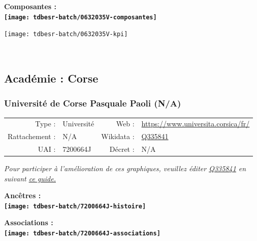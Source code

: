 \documentclass[12pt,french,]{article}
\begin{document}
\hrulefill

\begin{center} \bf Composantes : \\  
\texttt{[image: tdbesr-batch/0632035V-composantes]} \end{center}

\begin{center}\texttt{[image: tdbesr-batch/0632035V-kpi]} \end{center}\checkoddpage

\ifoddpage \fi ~\newpage  

\hypertarget{acaduxe9mie-corse}{%
\subsection{Académie : Corse}\label{acaduxe9mie-corse}}

\hypertarget{universituxe9-de-corse-pasquale-paoli-na}{%
\subsubsection{Université de Corse Pasquale Paoli
(N/A)}\label{universituxe9-de-corse-pasquale-paoli-na}}

\begin{tabular*}{\textwidth}{rp{5cm}rl}  
\hline  
Type : & Université & Web : &\href{https://www.universita.corsica/fr/}{https://www.universita.corsica/fr/} \\  
Rattachement : & N/A & Wikidata : & \href{https://www.wikidata.org/entity/Q335841}{Q335841} \\  
UAI : & 7200664J & Décret : & N/A \\  
\hline  
\end{tabular*}

\textit{\scriptsize Pour participer à l'amélioration de ces graphiques, veuillez éditer  \href{https://www.wikidata.org/entity/Q335841}{Q335841}  en suivant \href{https://github.com/cpesr/wikidataESR/blob/master/Rmd/wikidataESR.md}{ce guide.}}

\vspace{1cm}  
\begin{minipage}[b]{0.50\textwidth}\begin{center} \bf Ancêtres : \\  
\texttt{[image: tdbesr-batch/7200664J-histoire]} \end{center}\end{minipage}\begin{minipage}[b]{0.50\textwidth}\begin{center} \bf Associations : \\  
\texttt{[image: tdbesr-batch/7200664J-associations]} \end{center}\end{minipage}
\end{document}
